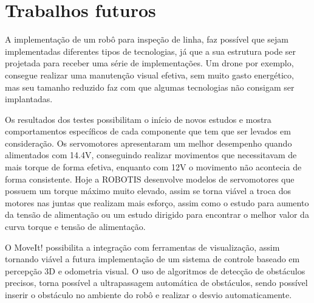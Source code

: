 \section{Trabalhos futuros}
\label{sec:trabfut}
A implementação de um robô para inspeção de linha, faz possível que sejam implementadas diferentes tipos de tecnologias, já que a sua estrutura pode ser projetada para receber uma série de implementações. Um drone por exemplo, consegue realizar uma manutenção visual efetiva, sem muito gasto energético, mas seu tamanho reduzido faz com que algumas tecnologias não consigam ser implantadas.

Os resultados dos testes possibilitam o início de novos estudos e mostra comportamentos específicos de cada componente que tem que ser levados em consideração. Os servomotores apresentaram um melhor desempenho quando alimentados com 14.4V, conseguindo realizar movimentos que necessitavam de mais torque de forma efetiva, enquanto com 12V o movimento não acontecia de forma consistente. Hoje a ROBOTIS desenvolve modelos de servomotores que possuem um torque máximo muito elevado, assim se torna viável a troca dos motores nas juntas que realizam mais esforço, assim como o estudo para aumento da tensão de alimentação ou um estudo dirigido para encontrar o melhor valor da curva torque e tensão de alimentação.

O MoveIt! possibilita a integração com ferramentas de visualização, assim tornando viável a futura implementação de um sistema de controle baseado em percepção 3D e odometria visual. O uso de algoritmos de detecção de obstáculos precisos, torna possível a ultrapassagem automática de obstáculos, sendo possível inserir o obstáculo no ambiente do robô e realizar o desvio automaticamente.






